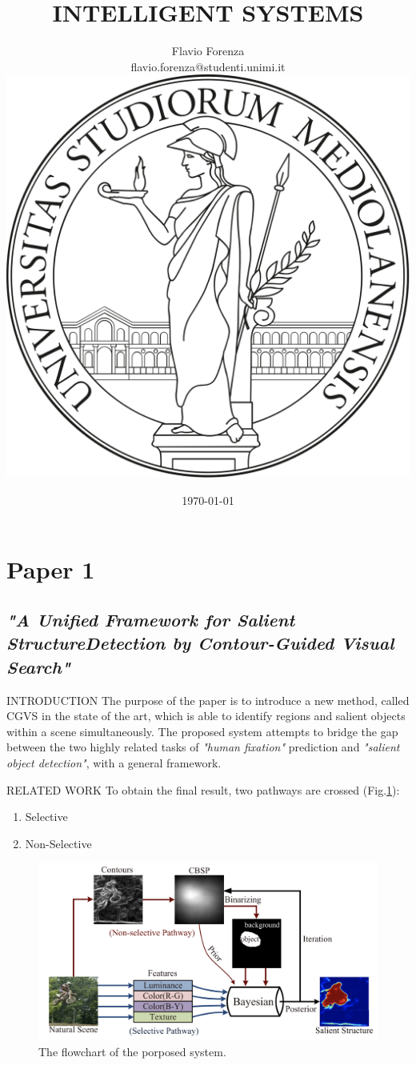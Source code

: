 \documentclass[10pt]{beamer}
\title[short]{INTELLIGENT SYSTEMS}
\author[Flavio Forenza]{Flavio Forenza \\ \tiny flavio.forenza@studenti.unimi.it\\[5mm] \includegraphics[scale = 0.06]{logoUnimi2.png}}
\institute{Department of Computer Science,\\ University of Milan, Italy}
\date{\tiny \today}
\begin{document}
\begin{frame}
    \maketitle
\end{frame}


\section{Paper 1}
\subsection{\emph{"A Unified Framework for Salient StructureDetection by Contour-Guided Visual Search"}}
\begin{frame}{INTRODUCTION}
    The purpose of the paper is to introduce a new method, called CGVS in the 
    state of the art, which is able to identify regions and salient objects 
    within a scene simultaneously. The proposed system attempts to 
    bridge the gap between the two highly related tasks of \emph{"human 
    fixation"} prediction and \emph{"salient object detection"}, with a general 
    framework.
\end{frame}

\begin{frame}{RELATED WORK}
    To obtain the final result, two pathways are crossed (Fig.\ref{fid: flowchart}):
    \begin{enumerate}
        \item Selective
        \item Non-Selective
    \end{enumerate}
    \begin{figure}[htbp]
        \centering
        \includegraphics[width = 0.8\linewidth]{images/paper1/selective and non-selective pathways.png}
        \centering
        \caption{The flowchart of the porposed system.}
        \label{fid: flowchart}
    \end{figure}
\end{frame}
\end{document}
